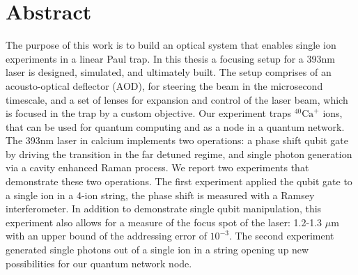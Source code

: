 \documentclass[english, a4paper, 12pt, twoside]{book}
\numberwithin{equation}{section} %
\begin{document}
{

}
\restoregeometry %

\thispagestyle{plain} %
\clearpage\mbox{}\clearpage %

\newpage

\section*{Abstract}
The purpose of this work is to build an optical system that enables single ion experiments in a linear Paul trap.
In this thesis a focusing setup for a 393nm laser is designed, simulated, and ultimately built. The setup comprises of an acousto-optical deflector (AOD), for steering the beam in the microsecond timescale, and a set of lenses for expansion and control of the laser beam, which is focused in the trap by a custom objective. Our experiment traps $^{40}\text{Ca}^+$ ions, that can be used for quantum computing and as a node in a quantum network. The 393nm laser in calcium implements two operations: a phase shift qubit gate by driving the transition in the far detuned regime, and single photon generation via a cavity enhanced Raman process. We report two experiments that demonstrate these two operations. The first experiment applied the qubit gate to a single ion in a 4-ion string, the phase shift is measured with a Ramsey interferometer. In addition to demonstrate single qubit manipulation, this experiment also allows for a measure of the focus spot of the laser: 1.2-1.3 $\mu$m with an upper bound of the addressing error of $10^{-3}$. The second experiment generated single photons out of a single ion in a string opening up new possibilities for our quantum network node.
\newpage


\newpage
\tableofcontents


\newpage
{} %
\setcounter{page}{1} %
\end{document}
